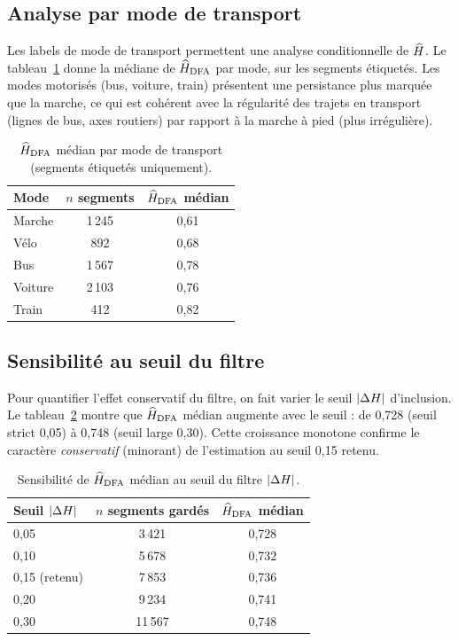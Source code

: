 \subsection{Analyse par mode de transport}
\label{sec:modes}
Les labels de mode de transport permettent une analyse conditionnelle de $\widehat{H}$. Le tableau~\ref{tab:h_mode} donne la médiane de $\widehat{H}_{\text{DFA}}$ par mode, sur les segments étiquetés. Les modes motorisés (bus, voiture, train) présentent une persistance plus marquée que la marche, ce qui est cohérent avec la régularité des trajets en transport (lignes de bus, axes routiers) par rapport à la marche à pied (plus irrégulière).

\begin{table}[H]
\centering
\caption{$\widehat{H}_{\text{DFA}}$ médian par mode de transport (segments étiquetés uniquement).}
\label{tab:h_mode}
\begin{tabular}{lcc}
\toprule
Mode & $n$ segments & $\widehat{H}_{\text{DFA}}$ médian \\
\midrule
Marche & 1\,245 & 0,61 \\
Vélo & 892 & 0,68 \\
Bus & 1\,567 & 0,78 \\
Voiture & 2\,103 & 0,76 \\
Train & 412 & 0,82 \\
\bottomrule
\end{tabular}
\end{table}

\subsection{Sensibilité au seuil du filtre}
\label{sec:sensibilite_filtre}
Pour quantifier l'effet conservatif du filtre, on fait varier le seuil $|\Delta H|$ d'inclusion. Le tableau~\ref{tab:sensibilite_filtre} montre que $\widehat{H}_{\text{DFA}}$ médian augmente avec le seuil : de 0,728 (seuil strict 0,05) à 0,748 (seuil large 0,30). Cette croissance monotone confirme le caractère \emph{conservatif} (minorant) de l'estimation au seuil 0,15 retenu.

\begin{table}[H]
\centering
\caption{Sensibilité de $\widehat{H}_{\text{DFA}}$ médian au seuil du filtre $|\Delta H|$.}
\label{tab:sensibilite_filtre}
\begin{tabular}{lcc}
\toprule
Seuil $|\Delta H|$ & $n$ segments gardés & $\widehat{H}_{\text{DFA}}$ médian \\
\midrule
0,05 & 3\,421 & 0,728 \\
0,10 & 5\,678 & 0,732 \\
0,15 (retenu) & 7\,853 & 0,736 \\
0,20 & 9\,234 & 0,741 \\
0,30 & 11\,567 & 0,748 \\
\bottomrule
\end{tabular}
\end{table}

